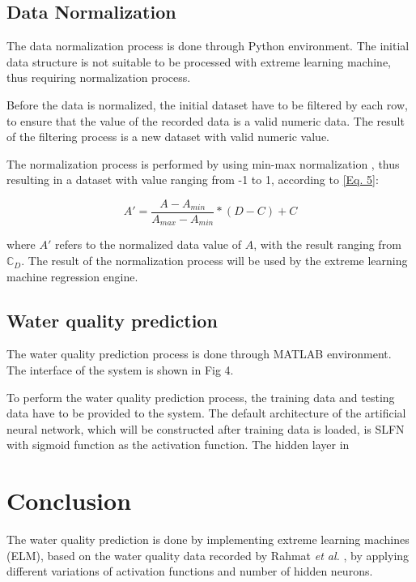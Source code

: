 \documentclass{ws-ijait}
\begin{document}
\subsection{Data Normalization}

The data normalization process is done through Python environment. The initial data structure is not suitable to be processed with extreme learning machine, thus requiring normalization process.

Before the data is normalized, the initial dataset have to be filtered by each row, to ensure that the value of the recorded data is a valid numeric data. The result of the filtering process is a new dataset with valid numeric value.

The normalization process is performed by using min-max normalization\cite{22} , thus resulting in a dataset with value ranging from -1 to 1, according to \eqref{Eq. 5}:

\begin{equation}
A' = \frac{A - A_{min}}{A_{max} - A_{min}} * (D - C) + C\label{Eq. 5}
\end{equation}

where $A'$ refers to the normalized data value of $A$, with the result ranging from $\mathbb{C}_{D}$. The result of the normalization process will be used by the extreme learning machine regression engine\cite{25}.

\subsection{Water quality prediction}

The water quality prediction process is done through MATLAB environment. The interface of the system is shown in Fig 4.


To perform the water quality prediction process, the training data and testing data have to be provided to the system. The default architecture of the artificial neural network, which will be constructed after training data is loaded, is SLFN with sigmoid function as the activation function. The hidden layer in 

\section{Conclusion}

The water quality prediction is done by implementing extreme learning machines (ELM), based on the water quality data recorded by Rahmat {\it et al.}\cite{16} , by applying different variations of activation functions and number of hidden neurons.
\end{document}

